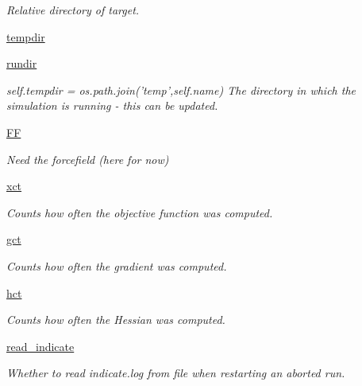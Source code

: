 \begin{DoxyCompactItemize}
\begin{DoxyCompactList}\small\item\em Relative directory of target. \end{DoxyCompactList}\item 
\hyperlink{classforcebalance_1_1target_1_1Target_aa1f01b5b78db253b5b66384ed11ed193}{tempdir}
\item 
\hyperlink{classforcebalance_1_1target_1_1Target_a6872de5b2d4273b82336ea5b0da29c9e}{rundir}
\begin{DoxyCompactList}\small\item\em self.\-tempdir = os.\-path.\-join('temp',self.\-name) The directory in which the simulation is running -\/ this can be updated. \end{DoxyCompactList}\item 
\hyperlink{classforcebalance_1_1target_1_1Target_a38a37919783141ea37fdcf8b00ce0aaf}{F\-F}
\begin{DoxyCompactList}\small\item\em Need the forcefield (here for now) \end{DoxyCompactList}\item 
\hyperlink{classforcebalance_1_1target_1_1Target_aad2e385cfbf7b4a68f1c2cb41133fe82}{xct}
\begin{DoxyCompactList}\small\item\em Counts how often the objective function was computed. \end{DoxyCompactList}\item 
\hyperlink{classforcebalance_1_1target_1_1Target_aa625ac88c6744eb14ef281d9496d0dbb}{gct}
\begin{DoxyCompactList}\small\item\em Counts how often the gradient was computed. \end{DoxyCompactList}\item 
\hyperlink{classforcebalance_1_1target_1_1Target_a5b5a42f78052b47f29ed4b940c6111a1}{hct}
\begin{DoxyCompactList}\small\item\em Counts how often the Hessian was computed. \end{DoxyCompactList}\item 
\hyperlink{classforcebalance_1_1target_1_1Target_aa8af57d5be669c4bb1c0cfd4b7a9220e}{read\-\_\-indicate}
\begin{DoxyCompactList}\small\item\em Whether to read indicate.\-log from file when restarting an aborted run. \end{DoxyCompactList}\item 

\end{DoxyCompactItemize}
